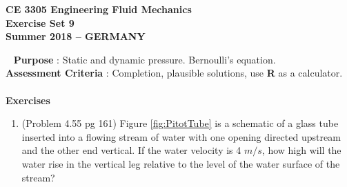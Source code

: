 \documentclass[12pt]{article}
\begin{document}
\begingroup
\begin{center}
{\textbf{{ CE 3305 Engineering Fluid Mechanics} \\ Exercise Set 9 \\ Summer 2018 -- GERMANY} }
\end{center}
\endgroup
\begingroup
~\newline
\textbf{Purpose} :  Static and dynamic pressure.  Bernoulli's equation. \\
\textbf{Assessment Criteria} : Completion, plausible solutions, use \textbf{R} as a calculator. \\~\\
\textbf{Exercises}

\begin{enumerate}
\item (Problem 4.55 pg 161)  Figure \ref{fig:PitotTube} is a schematic of a glass tube inserted into a flowing stream of water with one opening directed upstream and the other end vertical.  If the water velocity is 4 $m/s$, how high will the water rise in the vertical leg relative to the level of the water surface of the stream?


\end{enumerate}
\end{document}
